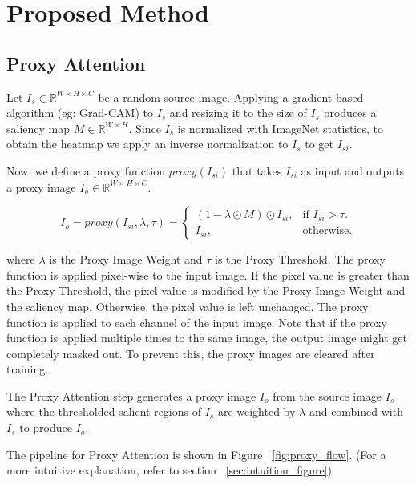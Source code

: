 \documentclass[a4paper,11pt,openright]{book}
\begin{document}
\chapter{Proposed Method} \label{ch:implementation}
\section{Proxy Attention}
Let $I_{s} \in \mathbb{R}^{W \times H \times C}$ be a random source image. 
Applying a gradient-based algorithm (eg: Grad-CAM) to $I_{s}$ and resizing it to the size of $I_{s}$ produces a saliency map $M \in \mathbb{R}^{W \times H}$. 
Since $I_{s}$ is normalized with ImageNet statistics, to obtain the heatmap we apply an inverse normalization to $I_{s}$ to get $I_{si}$.

Now, we define a proxy function $proxy(I_{si})$ that takes $I_{si}$ as input and outputs a proxy image $I_{o} \in \mathbb{R}^{W \times H \times C}$.

\begin{equation}
    I_{o} = proxy(I_{si}, \lambda, \tau)=\begin{cases}
        (1- \lambda \odot M) \odot I_{si}, & \text{if $I_{si}> \tau$}.\\
        I_{si}, & \text{otherwise}.
    \end{cases}
\end{equation}

where $\lambda$ is the Proxy Image Weight and $\tau$ is the Proxy Threshold. The proxy function is applied pixel-wise to the input image. If the pixel value is greater than the Proxy Threshold, the pixel value is modified by the Proxy Image Weight and the saliency map. Otherwise, the pixel value is left unchanged. The proxy function is applied to each channel of the input image. Note that if the proxy function is applied multiple times to the same image, the output image might get completely masked out. To prevent this, the proxy images are cleared after training.

The Proxy Attention step generates a proxy image $I_{o}$ from the source image $I_{s}$ where the thresholded salient regions of $I_{s}$ are weighted by $\lambda$ and combined with $I_{s}$ to produce $I_{o}$.

The pipeline for Proxy Attention is shown in Figure ~\ref{fig:proxy_flow}. (For a more intuitive explanation, refer to section ~\ref{sec:intuition_figure})\\
\end{document}
